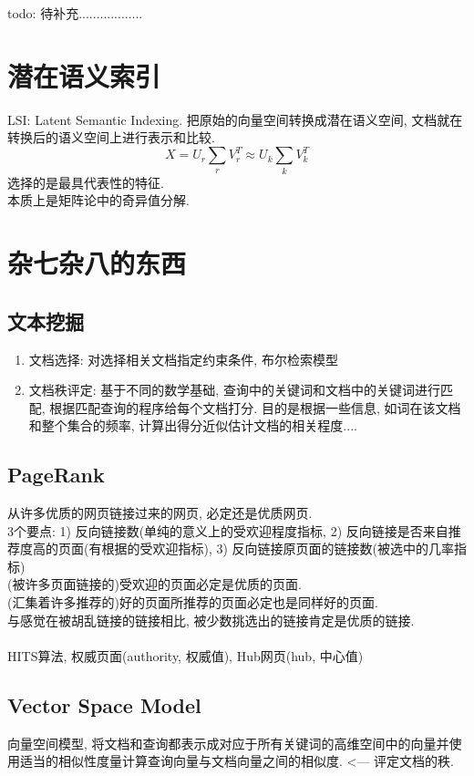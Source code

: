 \documentclass[a4paper,10pt,english]{article}
\begin{document}
todo: 待补充..................

\section {潜在语义索引}
LSI: Latent Semantic Indexing. 把原始的向量空间转换成潜在语义空间, 文档就在转换后的语义空间上进行表示和比较.
$$ X = U_r \sum_rV_r^T \approx U_k \sum_k V_k^T $$
选择的是最具代表性的特征.\\
本质上是矩阵论中的奇异值分解.

\section {杂七杂八的东西}
\subsection {文本挖掘}
\begin{enumerate}
\item{文档选择}: 对选择相关文档指定约束条件, 布尔检索模型
\item{文档秩评定}: 基于不同的数学基础, 查询中的关键词和文档中的关键词进行匹配, 根据匹配查询的程序给每个文档打分. 目的是根据一些信息, 如词在该文档和整个集合的频率, 计算出得分近似估计文档的相关程度....
\end{enumerate}

\subsection {PageRank}
从许多优质的网页链接过来的网页, 必定还是优质网页. \\
3个要点: 1) 反向链接数(单纯的意义上的受欢迎程度指标, 2) 反向链接是否来自推荐度高的页面(有根据的受欢迎指标), 3) 反向链接原页面的链接数(被选中的几率指标) \\
(被许多页面链接的)受欢迎的页面必定是优质的页面. \\
(汇集着许多推荐的)好的页面所推荐的页面必定也是同样好的页面. \\
与感觉在被胡乱链接的链接相比, 被少数挑选出的链接肯定是优质的链接. \\
\\
HITS算法, 权威页面(authority, 权威值), Hub网页(hub, 中心值)

\subsection {Vector Space Model}
向量空间模型, 将文档和查询都表示成对应于所有关键词的高维空间中的向量并使用适当的相似性度量计算查询向量与文档向量之间的相似度. <--- 评定文档的秩.
\end{document}
